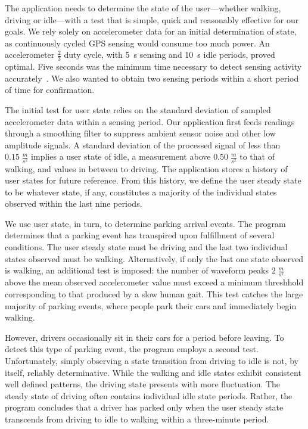 The application needs to determine the state of the user---whether walking,
driving or idle---with a test that is simple, quick and reasonably effective
for our goals. We rely solely on accelerometer data for an initial
determination of state, as continuously cycled GPS sensing would consume too
much power. An accelerometer $\frac{2}{3}$ duty cycle, with 5~s sensing and
10~s idle periods, proved optimal. Five seconds was the minimum time
necessary to detect sensing activity accurately~\cite{FIXME}. We also wanted
to obtain two sensing periods within a short period of time for confirmation.

The initial test for user state relies on the standard deviation of sampled
accelerometer data within a sensing period. Our application first feeds
readings through a smoothing filter to suppress ambient sensor noise and
other low amplitude signals. A standard deviation of the processed signal of
less than $0.15\;\frac{m}{s^2}$ implies a user state of idle, a measurement
above $0.50\;\frac{m}{s^2}$ to that of walking, and values in between to
driving. The application stores a history of user states for future
reference. From this history, we define the user steady state to be whatever
state, if any, constitutes a majority of the individual states observed
within the last nine periods.

We use user state, in turn, to determine parking arrival events. The program
determines that a parking event has transpired upon fulfillment of several
conditions. The user steady state must be driving and the last two
individual states observed must be walking. Alternatively, if only the last
one state observed is walking, an additional test is imposed: the number of
waveform peaks $2\;\frac{m}{s^2}$ above the mean observed accelerometer value
must exceed a minimum threshhold corresponding to that produced by a slow
human gait. This test catches the large majority of parking events, where
people park their cars and immediately begin walking.

However, drivers occasionally sit in their cars for a period before leaving.
To detect this type of parking event, the program employs a second test.
Unfortunately, simply observing a state transition from driving to idle is
not, by itself, reliably determinative. While the walking and idle states
exhibit consistent well defined patterns, the driving state presents with
more fluctuation. The steady state of driving often contains individual idle
state periods. Rather, the program concludes that a driver has parked only
when the user steady state transcends from driving to idle to walking within
a three-minute period.


